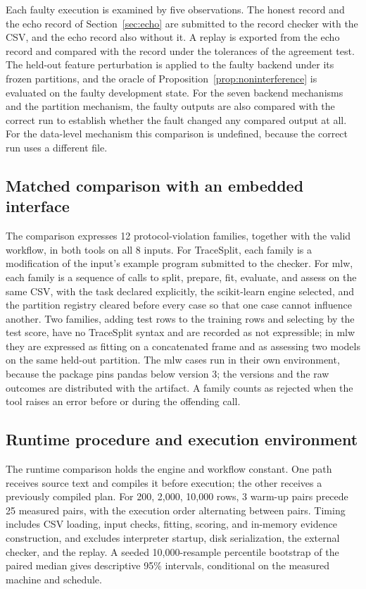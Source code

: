 \documentclass[lettersize,journal]{IEEEtran}
\newcommand{\tool}{TraceSplit}
\begin{document}
Each faulty execution is examined by five observations. The honest record and the echo record of Section~\ref{sec:echo} are submitted to the record checker with the CSV, and the echo record also without it. A replay is exported from the echo record and compared with the record under the tolerances of the agreement test. The held-out feature perturbation is applied to the faulty backend under its frozen partitions, and the oracle of Proposition~\ref{prop:noninterference} is evaluated on the faulty development state. For the seven backend mechanisms and the partition mechanism, the faulty outputs are also compared with the correct run to establish whether the fault changed any compared output at all. For the data-level mechanism this comparison is undefined, because the correct run uses a different file.

\subsection{Matched comparison with an embedded interface}\label{sec:comparisonmethod}
The comparison expresses 12 protocol-violation families, together with the valid workflow, in both tools on all 8 inputs. For \tool{}, each family is a modification of the input's example program submitted to the checker. For mlw, each family is a sequence of calls to split, prepare, fit, evaluate, and assess on the same CSV, with the task declared explicitly, the scikit-learn engine selected, and the partition registry cleared before every case so that one case cannot influence another. Two families, adding test rows to the training rows and selecting by the test score, have no \tool{} syntax and are recorded as not expressible; in mlw they are expressed as fitting on a concatenated frame and as assessing two models on the same held-out partition. The mlw cases run in their own environment, because the package pins pandas below version 3; the versions and the raw outcomes are distributed with the artifact. A family counts as rejected when the tool raises an error before or during the offending call.

\subsection{Runtime procedure and execution environment}
The runtime comparison holds the engine and workflow constant. One path receives source text and compiles it before execution; the other receives a previously compiled plan. For 200, 2,000, 10,000 rows, 3 warm-up pairs precede 25 measured pairs, with the execution order alternating between pairs. Timing includes CSV loading, input checks, fitting, scoring, and in-memory evidence construction, and excludes interpreter startup, disk serialization, the external checker, and the replay. A seeded 10,000-resample percentile bootstrap of the paired median gives descriptive 95\% intervals, conditional on the measured machine and schedule.
\end{document}
